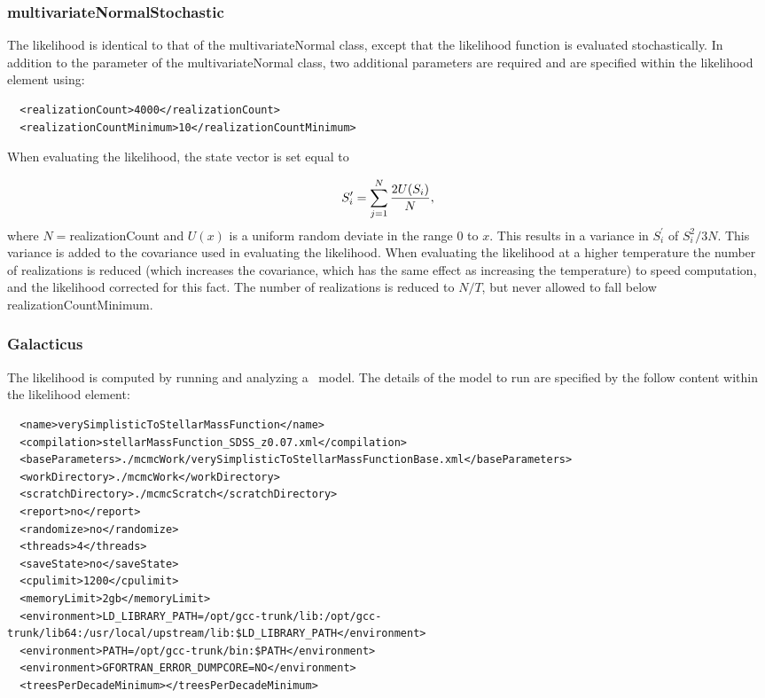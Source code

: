 \subsubsection{multivariateNormalStochastic}

The likelihood is identical to that of the {\normalfont \ttfamily multivariateNormal} class, except that the likelihood function is evaluated stochastically. In addition to the parameter of the {\normalfont \ttfamily multivariateNormal} class, two additional parameters are required and are specified within the {\normalfont \ttfamily likelihood} element using:
\begin{verbatim}
  <realizationCount>4000</realizationCount>
  <realizationCountMinimum>10</realizationCountMinimum>
\end{verbatim}
When evaluating the likelihood, the state vector is set equal to 

\begin{equation}
 S^\prime_i = \sum_{j=1}^N {2 U(S_i) \over N},
\end{equation}
where $N=${\normalfont \ttfamily realizationCount} and $U(x)$ is a uniform random deviate in the range $0$ to $x$. This results in a variance in $S^\prime_i$ of $S_i^2/3N$. This variance is added to the covariance used in evaluating the likelihood. When evaluating the likelihood at a higher temperature the number of realizations is reduced (which increases the covariance, which has the same effect as increasing the temperature) to speed computation, and the likelihood corrected for this fact. The number of realizations is reduced to $N/T$, but never allowed to fall below {\normalfont \ttfamily realizationCountMinimum}.

\subsubsection{Galacticus}

The likelihood is computed by running and analyzing a \glc\ model. The details of the model to run are specified by the follow content within the {\normalfont \ttfamily likelihood} element:
\begin{verbatim}
  <name>verySimplisticToStellarMassFunction</name>
  <compilation>stellarMassFunction_SDSS_z0.07.xml</compilation>
  <baseParameters>./mcmcWork/verySimplisticToStellarMassFunctionBase.xml</baseParameters>
  <workDirectory>./mcmcWork</workDirectory>
  <scratchDirectory>./mcmcScratch</scratchDirectory>
  <report>no</report>
  <randomize>no</randomize>
  <threads>4</threads>
  <saveState>no</saveState>
  <cpulimit>1200</cpulimit>
  <memoryLimit>2gb</memoryLimit>
  <environment>LD_LIBRARY_PATH=/opt/gcc-trunk/lib:/opt/gcc-trunk/lib64:/usr/local/upstream/lib:$LD_LIBRARY_PATH</environment>
  <environment>PATH=/opt/gcc-trunk/bin:$PATH</environment>
  <environment>GFORTRAN_ERROR_DUMPCORE=NO</environment>
  <treesPerDecadeMinimum></treesPerDecadeMinimum>
\end{verbatim}

